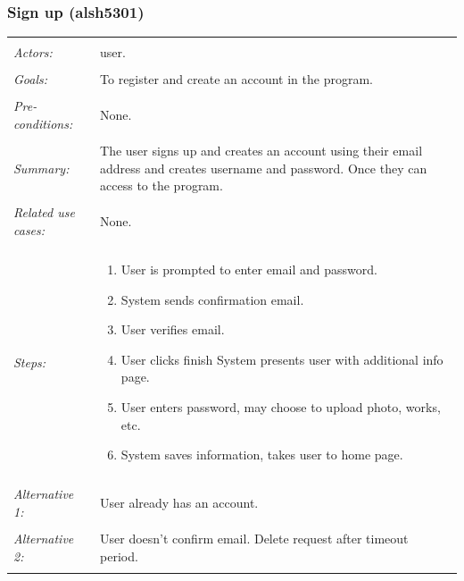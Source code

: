 \documentclass[11pt]{report}
\begin{document}
\subsubsection{Sign up (alsh5301)}
\begin{tabular}{ p{2cm} p{12cm} }
 \hline
 \\
 \textit{Actors:} & user. \\ 
 \\
 \textit{Goals:} & To register and create an account in the program. \\
 \\
 \textit{Pre-conditions:} & None. \\
 \\
 \textit{Summary:} & The user signs up and creates an account using their email address and creates username and password. Once they can access to the program. \\ 
 \\
 \textit{Related use cases:} & None. \\ 
 \\
 \textit{Steps:} & \begin{enumerate}
  \item User is prompted to enter email and password. 
  \item System sends confirmation email. 
  \item User verifies email. 
  \item User clicks finish System presents user with additional info page. 
  \item User enters password, may choose to upload photo, works, etc. 
  \item System saves information, takes user to home page. 
 \end{enumerate} \\
 \\
 \textit{Alternative 1:} & User already has an account. \\ 
 \\
 \textit{Alternative 2:} & User doesn't confirm email. Delete request after timeout period. \\
 \\
\hline
\end{tabular}
\end{document}
